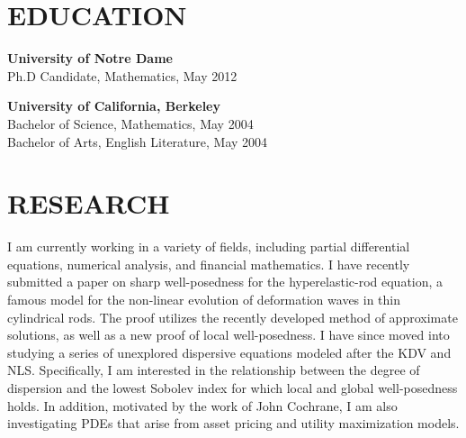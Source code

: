 \documentclass{resume}
\begin{document}
\begin{resume}


	\section{EDUCATION}  \vspace{0.05in}
	\textbf{University of Notre Dame} \\
	Ph.D Candidate, Mathematics, May 2012 

	{\bf \vspace{-0.1in} University of California, Berkeley}\\
	Bachelor of Science, Mathematics, May 2004\\
	Bachelor of Arts, English Literature, May 2004
	
	\section{RESEARCH}
	\vspace{0.05in}
	I am currently working in a variety of fields, including partial 
	 differential equations, numerical analysis, and financial mathematics. I 
	 have recently submitted a paper on sharp well-posedness for the 
	 hyperelastic-rod equation, a famous model for the non-linear evolution of 
	 deformation waves in thin cylindrical rods. The proof utilizes the recently 
	 developed method of approximate solutions, as well as a new proof of local 
	 well-posedness. I have since moved into studying a series of unexplored 
	 dispersive equations modeled after the KDV and NLS. Specifically, I am 
	 interested in the relationship between the degree of dispersion and the 
	 lowest Sobolev index for which local and global well-posedness holds. In 
	 addition, motivated by the work of John Cochrane, I am also investigating 
	 PDEs that arise from asset pricing and utility maximization models.

\end{resume}
\end{document}
